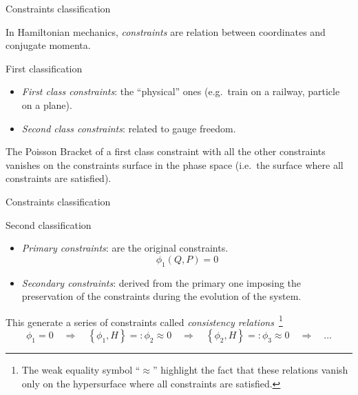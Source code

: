 \begin{frame}{Constraints classification}
  \begin{definition} \vspace{0.3em}
    In Hamiltonian mechanics, \emph{constraints} are relation between
    coordinates and conjugate momenta.
  \end{definition}
  \begin{alertblock}{First classification}
    \begin{itemize}
      \item \emph{First class constraints}: the ``physical'' ones (e.g.\ train
        on a railway, particle on a plane).
      \item \emph{Second class constraints}: related to gauge freedom.
    \end{itemize}
  \end{alertblock}
  \begin{remark} \vspace{0.3em}
    The Poisson Bracket of a first class constraint with all the
    other constraints vanishes on the constraints surface in the phase space
    (i.e.\ the surface where all constraints are satisfied).
  \end{remark}
\end{frame}

\begin{frame}{Constraints classification}
  \begin{alertblock}{Second classification}
    \begin{itemize}
      \item \emph{Primary constraints}: are the original constraints.
      \begin{equation*} \label{eq:constraint}
        \phi_1(Q, P) = 0
      \end{equation*}
      \item \emph{Secondary constraints}: derived from the primary one
        imposing the preservation of the constraints during the evolution of
        the system.
    \end{itemize}
    This generate a series of constraints called \emph{consistency
      relations}~\footnote{
      The weak equality symbol ``$\approx$'' highlight the fact that these
      relations vanish only on the hypersurface where all constraints are
      satisfied.
    }
    \begin{equation*} \label{eq:consistency_relations}
      \phi_1 = 0 \quad \Rightarrow \quad
      \left\{ \phi_1 , H \right\} =: \phi_2 \approx 0 \quad \Rightarrow \quad
      \left\{ \phi_2 , H \right\} =: \phi_3 \approx 0 \quad \Rightarrow \quad
      \ldots
    \end{equation*}
  \end{alertblock}
\end{frame}

